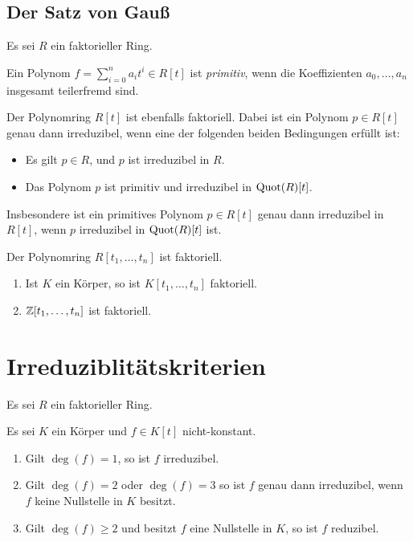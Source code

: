 \subsection{Der Satz von Gauß}

Es sei $R$ ein faktorieller Ring.

\begin{definition}
  Ein Polynom $f = \sum_{i=0}^n a_i t^i \in R[t]$ ist \emph{primitiv}, wenn die Koeffizienten $a_0, \dotsc, a_n$ insgesamt teilerfremd sind.
\end{definition}

\begin{theorem}
  Der Polynomring $R[t]$ ist ebenfalls faktoriell.
  Dabei ist ein Polynom $p \in R[t]$ genau dann irreduzibel, wenn eine der folgenden beiden Bedingungen erfüllt ist:
  \begin{itemize}
    \item
      Es gilt $p \in R$, und $p$ ist irreduzibel in $R$.
    \item
      Das Polynom $p$ ist primitiv und irreduzibel in $\operatorname{Quot}(R)[t]$.
  \end{itemize}
  Insbesondere ist ein primitives Polynom $p \in R[t]$ genau dann irreduzibel in $R[t]$, wenn $p$ irreduzibel in $\operatorname{Quot}(R)[t]$ ist.
\end{theorem}

\begin{corollary}
  Der Polynomring $R[t_1, \dotsc, t_n]$ ist faktoriell.
\end{corollary}

\begin{example}
  \begin{enumerate}
    \item
      Ist $K$ ein Körper, so ist $K[t_1, \dotsc, t_n]$ faktoriell.
    \item
      $\mathbb{Z}[t_1, \dotsc, t_n]$ ist faktoriell.
  \end{enumerate}
\end{example}





\section{Irreduziblitätskriterien}

Es sei $R$ ein faktorieller Ring.

\begin{lemma}
  Es sei $K$ ein Körper und $f \in K[t]$ nicht-konstant.
  \begin{enumerate}
    \item
      Gilt $\deg(f) = 1$, so ist $f$ irreduzibel.
    \item
      Gilt $\deg(f) = 2$ oder $\deg(f) = 3$ so ist $f$ genau dann irreduzibel, wenn $f$ keine Nullstelle in $K$ besitzt.
    \item
      Gilt $\deg(f) \geq 2$ und besitzt $f$ eine Nullstelle in $K$, so ist $f$ reduzibel.
  \end{enumerate}
\end{lemma}


